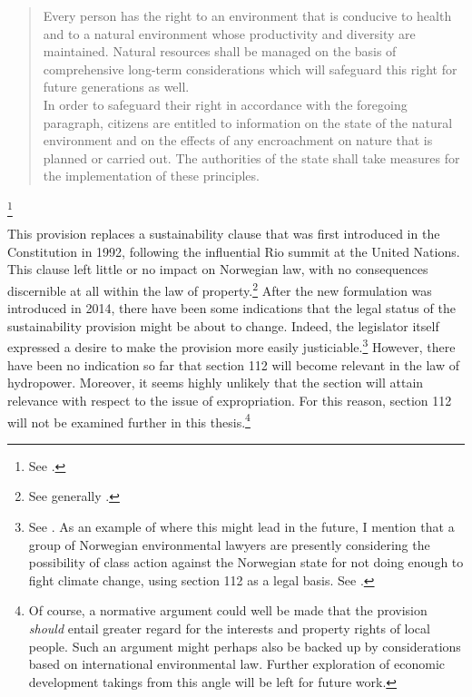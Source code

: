 \begin{quote}
Every person has the right to an environment that is conducive to
health and to a natural environment whose productivity and diversity
are maintained. Natural resources shall be managed on the basis of
comprehensive long-term considerations which will safeguard this
right for future generations as well. \\
In order to safeguard their right in accordance with the foregoing
paragraph, citizens are entitled to information on the state of the
natural environment and on the effects of any encroachment on nature
that is planned or carried out. The authorities of the state shall take measures for the
implementation of these principles.
\end{quote}\footnote{See \cite[112]{grunnloven14}.}

This provision replaces a sustainability clause that was first introduced in the Constitution in 1992, following the influential Rio summit at the United Nations. This clause left little or no impact on Norwegian law, with no consequences discernible at all within the law of property.\footnote{See generally \cite{fauchald07}.} After the new formulation was introduced in 2014, there have been some indications that the legal status of the sustainability provision might be about to change. Indeed, the legislator itself expressed a desire to make the provision more easily justiciable.\footnote{See \cite[246]{dok16}. As an example of where this might lead in the future, I mention that a group of Norwegian environmental lawyers are presently considering the possibility of class action against the Norwegian state for not doing enough to fight climate change, using section 112 as a legal basis. See \cite{gjengedal15}.} However, there have been no indication so far that section 112 will become relevant in the law of hydropower. Moreover, it seems highly unlikely that the section will attain relevance with respect to the issue of expropriation. For this reason, section 112 will not be examined further in this thesis.\footnote{Of course, a normative argument could well be made that the provision {\it should} entail greater regard for the interests and property rights of local people. Such an argument might perhaps also be backed up by considerations based on international environmental law. Further exploration of economic development takings from this angle will be left for future work.}

